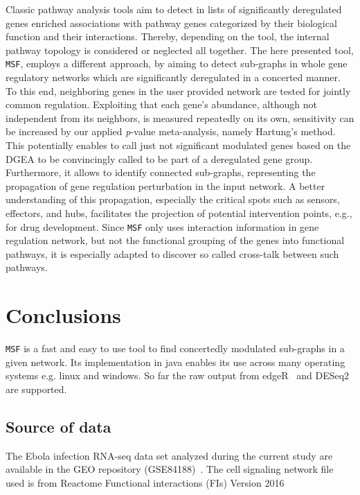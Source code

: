 \documentclass[10pt,a4paper,twocolumn]{article}
\begin{document}
	Classic pathway analysis tools aim to detect in lists of significantly
	deregulated genes enriched associations with pathway genes categorized by
	their biological function and their interactions. Thereby, depending on the
	tool, the internal pathway topology is considered or neglected all
	together. The here presented tool, \texttt{MSF}, employs a different
	approach, by aiming to detect sub-graphs in whole gene regulatory networks
	which are significantly deregulated in a concerted manner. To this end,
	neighboring genes in the user provided network are tested for jointly
	common regulation. Exploiting that each gene's abundance, although not
	independent from its neighbors, is measured repeatedly on its own,
	sensitivity can be increased by our applied \textit{p}-value meta-analysis, namely
	Hartung's method. This potentially enables to call just not significant
	modulated genes based on the DGEA to be convincingly called to be part of a
	deregulated gene group.  Furthermore, it allows to identify connected
	sub-graphs, representing the propagation of gene regulation perturbation in
	the input network. A better understanding of this propagation, especially
	the critical spots such as sensors, effectors, and hubs, facilitates the projection of potential intervention points,
	e.g., for drug development. Since \texttt{MSF} only uses interaction
	information in gene regulation network, but not the functional grouping of
	the genes into functional pathways, it is especially adapted to discover so
	called cross-talk between such pathways.
	
	
	\section*{Conclusions}
	
	
	\texttt{MSF} is a fast and easy to use tool to find concertedly
	modulated sub-graphs in a given network. Its implementation in java enables
	its use across many operating systems e.g. linux and windows. So far the raw output from edgeR~\cite{edgeR} and DESeq2~\cite{love2014moderated} are supported.
	
	\subsection*{Source of data}
	
	The Ebola infection RNA-seq data set analyzed during the current study are
	available in the GEO repository (GSE84188)~\cite{Olejnik}. The cell
	signaling network file used is from Reactome Functional interactions (FIs)
	Version 2016~\cite{Cytokegg}
	
\end{document}
